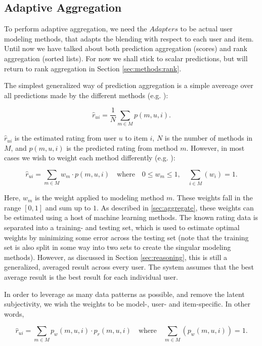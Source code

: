 \subsection{Adaptive Aggregation}

To perform adaptive aggregation, we need the $Adapters$ to be actual user modeling methods,
that adapts the blending with respect to each user and item.
Until now we have talked about both prediction aggregation (scores) and rank aggregation (sorted lists).
For now we shall stick to scalar predictions, but will return to rank aggregation in Section \ref{sec:methods:rank}.

The simplest generalized way of prediction aggregation is a simple avereage over all predictions made
by the different methods (e.g. \citet[p3]{Aslam2001}):

\begin{equation*}
  \hat{r}_{ui} = \frac{1}{N} \sum_{m \in M} p(m,u,i).
\end{equation*}

$\hat{r}_{ui}$ is the estimated rating from user $u$ to item $i$,
$N$ is the number of methods in $M$, and $p(m,u,i)$ is the predicted rating from method $m$.
However, in most cases we wish to weight each method differently (e.g. \cite{Claypool1999} ):

\begin{equation*}
  \hat{r}_{ui} = \sum_{m \in M} w_{m} \cdot p(m,u,i) 
  \quad \text{where} \quad 0 \leq w_{m} \leq 1, \quad \sum_{i \in M} (w_i) = 1.
\end{equation*}

Here, $w_m$ is the weight applied to modeling method $m$. These weights fall in the range $[0,1]$ and sum up to $1$.
As described in \ref{sec:aggregate}, these weights can be estimated using a host of machine learning methods.
The known rating data is separated into a training- and testing set, which is used to estimate optimal weights
by minimizing some error across the testing set 
(note that the training set is also split in some way into two sets to create the singular modeling methods).
However, as discussed in Section \ref{sec:reasoning},
this is still a generalized, averaged result across every user. 
The system assumes that the best average result is the best result for each individual user.

In order to leverage as many data patterns as possible, and remove the latent subjectivity,
we wish the weights to be model-, user- and item-specific. In other words,

\begin{equation*}
  \hat{r}_{ui} = \sum_{m \in M} p_{w}(m,u,i) \cdot p_{r}(m,u,i)
  \quad \text{where} \quad
  \sum_{m \in M} (p_{w}(m,u,i)) = 1.
\end{equation*}

